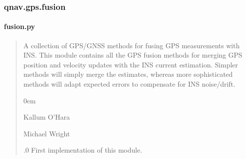 \documentclass[letterpaper,10pt,english]{sphinxmanual}
\begin{document}
\sphinxstepscope


\subsubsection{qnav.gps.fusion}
\label{\detokenize{modules/gps/fusion:module-qnav.gps.fusion}}\label{\detokenize{modules/gps/fusion:qnav-gps-fusion}}\label{\detokenize{modules/gps/fusion::doc}}

\paragraph{fusion.py}
\label{\detokenize{modules/gps/fusion:fusion-py}}\begin{quote}\begin{description}
\sphinxAtStartPar
A collection of GPS/GNSS methods for fusing GPS measurements with INS.
This module contains all the GPS fusion methods for merging GPS
position and velocity updates with the INS current estimation.
Simpler methods will simply merge the estimates, whereas more
sophisticated methods will adapt expected errors to compensate
for INS noise/drift.

\begin{DUlineblock}{0em}
\item[] Kallum O’Hara \sphinxhyphen{} 
\item[] Michael Wright \sphinxhyphen{} 
\end{DUlineblock}

.0 \sphinxhyphen{} First implementation of this module.

\end{description}\end{quote}
\end{document}
